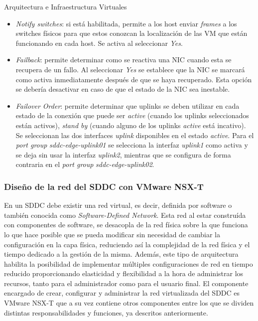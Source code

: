 \begin{subsection}{Arquitectura e Infraestructura Virtuales\cite{CFVirtInfraes}}
\begin{itemize}
  \item \textit{Notify switches}: si está habilitada, permite a los host enviar \textit{frames} a los switches físicos para que estos conozcan la localización de las VM que están funcionando en cada host. Se activa al seleccionar \textit{Yes}.
  
  \item \textit{Failback}: permite determinar como se reactiva una NIC cuando esta se recupera de un fallo. Al seleccionar \textit{Yes} se establece que la NIC se marcará como activa inmediatamente después de que se haya recuperado. Esta opción se debería desactivar en caso de que el estado de la NIC sea inestable.
  
  \item \textit{Failover Order}: permite determinar que uplinks se deben utilizar en cada estado de la conexión que puede ser \textit{active} (cuando los uplinks seleccionados están activos), \textit{stand by} (cuando alguno de los uplinks \textit{active} está incativo). Se seleccionan las dos interfaces \textit{uplink} disponibles en el estado \textit{active}. Para el \textit{port group} \textit{sddc-edge-uplink01} se selecciona la interfaz \textit{uplink1} como activa y se deja sin usar la interfaz \textit{uplink2}, mientras que se configura de forma contraria en el \textit{port group} \textit{sddc-edge-uplink02}.
\end{itemize}


\subsubsection{Diseño de la red del SDDC con VMware NSX-T}
En un SDDC debe existir una red virtual, es decir, definida por software o también conocida como \textit{Software-Defined Network}. Esta red al estar construída con componentes de software, se desacopla de la red física sobre la que funciona lo que hace posible que se pueda modificar sin necesidad de cambiar la configuración en la capa física, reduciendo así la complejidad de la red física y el tiempo dedicado a la gestión de la misma. Además, este tipo de arquitectura habilita la posibilidad de implementar múltiples configuraciones de red en tiempo reducido proporcionando elasticidad y flexibilidad a la hora de administrar los recursos, tanto para el administrador como para el usuario final.
El componente encargado de crear, configurar y administrar la red virtualizada del SDDC es VMware NSX-T que a su vez contiene otros componentes entre los que se dividen distintas responsabilidades y funciones, ya descritos anteriormente.


\end{subsection}
